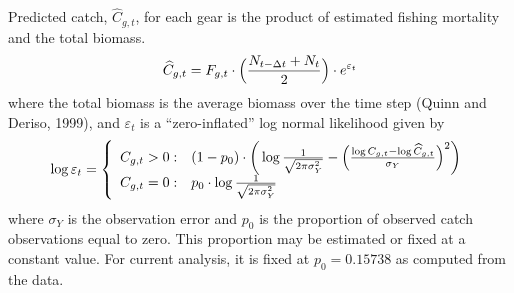 \documentclass[12pt,letterpaper,twoside]{article}
\begin{document}
Predicted catch, $\widehat{C}_{g,t}$, for each gear is the product of
estimated fishing mortality and the total biomass.
\begin{equation}
\widehat{C}_{g,t} = F_{g,t}\cdot\Bigl(\frac{N_{t-\Delta
t}+N_t}{2}\Bigr) \cdot e^{\varepsilon_t}
\label{eqn:obs1}
\end{equation}
where the total biomass is  the average
biomass over the time step (Quinn and Deriso, 1999), and
$\varepsilon_t$ is a ``zero-inflated'' log normal likelihood given by
\begin{equation}
  \log \varepsilon_t = \left\{
    \begin{array}{r@{\;:\quad}l}
       C_{g,t} > 0 &
(1-p_0)\cdot\bigg(\log\frac{1}{\sqrt{2\pi\sigma^2_Y}}
          -\Bigl(\frac{\log
C_{g,t}-\log\widehat{C}_{g,t}}{\sigma_Y}\Bigr)^2\bigg)\\
       C_{g,t} = 0 & p_0 \cdot\log \frac{1}{\sqrt{2\pi\sigma^2_Y}}\\
    \end{array}
  \right.
\end{equation}
where $\sigma_Y$ is the observation error and
$p_0$ is the proportion of observed catch observations equal to zero.
This proportion may be estimated or fixed at a constant value. For
current analysis, it is fixed at $p_0 = 0.15738$ as computed from the data.
\end{document}

